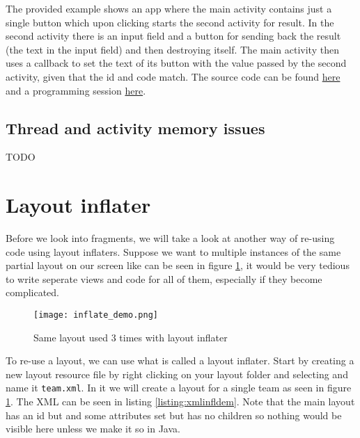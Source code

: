 The provided example shows an app where the main activity contains just a single button which upon clicking starts the second activity for result. In the second activity there is an input field and a button for sending back the result (the text in the input field) and then destroying itself. The main activity then uses a callback to set the text of its button with the value passed by the second activity, given that the id and code match. The source code can be found \href{https://github.com/JonSteinn/AndroidDevelopment/tree/master/examples/lab3/activityforresult}{here} and a programming session \href{TODO}{here}.

\subsection{Thread and activity memory issues}
TODO

\section{Layout inflater}
Before we look into fragments, we will take a look at another way of re-using code using layout inflaters. Suppose we want to multiple instances of the same partial layout on our screen like can be seen in figure \ref{fig:infldem}, it would be very tedious to write seperate views and code for all of them, especially if they become complicated. 

\begin{figure}[H]
\centering
\texttt{[image: inflate\_demo.png]}
\caption{Same layout used 3 times with layout inflater}
\label{fig:infldem}
\end{figure}

To re-use a layout, we can use what is called a layout inflater. Start by creating a new layout resource file by right clicking on your layout folder and selecting  and name it \texttt{team.xml}. In it we will create a layout for a single team as seen in figure \ref{fig:infldem}. The XML can be seen in listing \ref{listing:xmlinfldem}. Note that the main layout has an id but and some attributes set but has no children so nothing would be visible here unless we make it so in Java.

